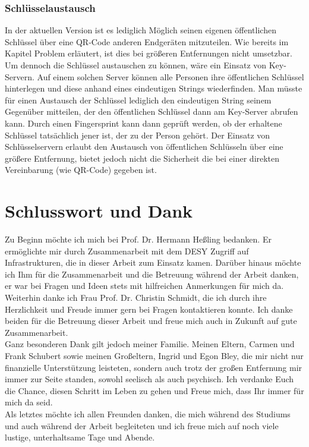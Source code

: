 \documentclass[10pt, a4paper,headsepline]{scrreprt}
\begin{document}
\subsection{Schlüsselaustausch}
In der aktuellen Version ist es lediglich Möglich seinen eigenen öffentlichen Schlüssel über eine QR-Code anderen Endgeräten mitzuteilen. Wie bereits im Kapitel Problem erläutert, ist dies bei größeren Entfernungen nicht umsetzbar. Um dennoch die Schlüssel austauschen zu können, wäre ein Einsatz von Key-Servern. Auf einem solchen Server können alle Personen ihre öffentlichen Schlüssel hinterlegen und diese anhand eines eindeutigen Strings wiederfinden. Man müsste für einen Austausch der Schlüssel lediglich den eindeutigen String seinem Gegenüber mitteilen, der den öffentlichen Schlüssel dann am Key-Server abrufen kann. Durch einen Fingersprint kann dann geprüft werden, ob der erhaltene Schlüssel tatsächlich jener ist, der zu der Person gehört. Der Einsatz von Schlüsselservern erlaubt den Austausch von öffentlichen Schlüsseln über eine größere Entfernung, bietet jedoch nicht die Sicherheit die bei einer direkten Vereinbarung (wie QR-Code) gegeben ist.

\chapter{Schlusswort und Dank}
Zu Beginn möchte ich mich bei Prof. Dr. Hermann Heßling bedanken. Er ermöglichte mir durch Zusammenarbeit mit dem DESY Zugriff auf Infrastrukturen, die in dieser Arbeit zum Einsatz kamen. Darüber hinaus möchte ich Ihm für die Zusammenarbeit und die Betreuung während der Arbeit danken, er war bei Fragen und Ideen stets mit hilfreichen Anmerkungen für mich da. Weiterhin danke ich Frau Prof. Dr. Christin Schmidt, die ich durch ihre Herzlichkeit und Freude immer gern bei Fragen kontaktieren konnte. Ich danke beiden für die Betreuung dieser Arbeit und freue mich auch in Zukunft auf gute Zusammenarbeit. \\
Ganz besonderen Dank gilt jedoch meiner Familie. Meinen Eltern, Carmen und Frank Schubert sowie meinen Großeltern, Ingrid und Egon Bley, die mir nicht nur finanzielle Unterstützung leisteten, sondern auch trotz der großen Entfernung mir immer zur Seite standen, sowohl seelisch als auch psychisch. Ich verdanke Euch die Chance, diesen Schritt im Leben zu gehen und Freue mich, dass Ihr immer für mich da seid. \\
Als letztes möchte ich allen Freunden danken, die mich während des Studiums und auch während der Arbeit begleiteten und ich freue mich auf noch viele lustige, unterhaltsame Tage und Abende.
\end{document}
